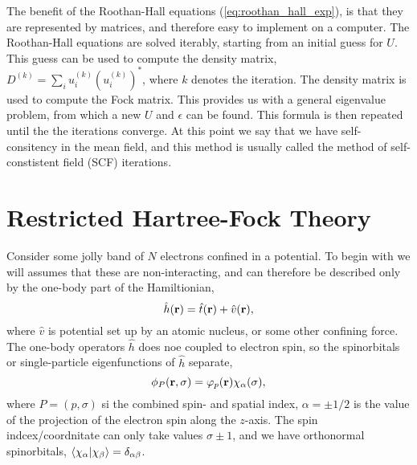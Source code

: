 The benefit of the Roothan-Hall equations (\autoref{eq:roothan_hall_exp}), is that they 
are represented by matrices, and therefore easy to implement on a computer. The
Roothan-Hall equations are solved iterably, starting from an initial guess for $U$. 
This guess can be used to compute the density matrix, 
$D^(k) = \sum_i u_i^{(k)}(u_i^{(k)})^*$, where $k$ denotes the iteration. The density 
matrix is used to compute the Fock matrix. This provides us with a general eigenvalue 
problem, from which a new $U$ and $\epsilon$ can be found. This formula is then repeated
until the the iterations converge. At this point we say that we have self-consitency 
in the mean field, and this method is usually called the method of self-constistent
field (SCF) iterations.

\section{Restricted Hartree-Fock Theory}

Consider some jolly band of $N$ electrons confined in a potential. 
To begin with we will assumes that these are non-interacting, and can therefore be 
described only by the one-body part of the Hamiltionian,
\begin{equation}
    \hat{h}(\vb{r}) = \hat{t}(\vb{r}) + \hat{v}(\vb{r}),
\end{equation}
where $\hat{v}$ is potential set up by an atomic nucleus, or some other confining
force. The one-body operators $\hat{h}$ does noe coupled to electron spin, so the 
spinorbitals or single-particle eigenfunctions of $\hat{h}$ separate,
\begin{equation}
    \phi_P(\vb{r}, \sigma) = \varphi_p(\vb{r})\chi_\alpha(\sigma),
\end{equation}
where $P = (p, \sigma)$ si the combined spin- and spatial index, $\alpha = \pm 1/2$
is the value of the projection of the electron spin along the $z$-axis. The spin 
indcex/coordnitate can only take values $\sigma \pm 1$, and we have orthonormal 
spinorbitals, $\braket{\chi_\alpha}{\chi_\beta} = \delta_{\alpha\beta}$. 

